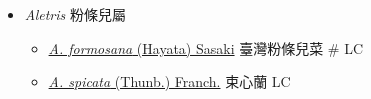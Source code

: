 
  \begin{itemize}
 \item[] \textit{Aletris} 粉條兒屬
                                
  \begin{itemize}
        \item[] \href{http://www.theplantlist.org/tpl1.1/search?q=Aletris+formosana}{\textit{A. formosana} (Hayata) Sasaki}   臺灣粉條兒菜  \# LC
        \item[] \href{http://www.theplantlist.org/tpl1.1/search?q=Aletris+spicata}{\textit{A. spicata} (Thunb.) Franch.}   束心蘭   LC
  \end{itemize}
  \end{itemize}

